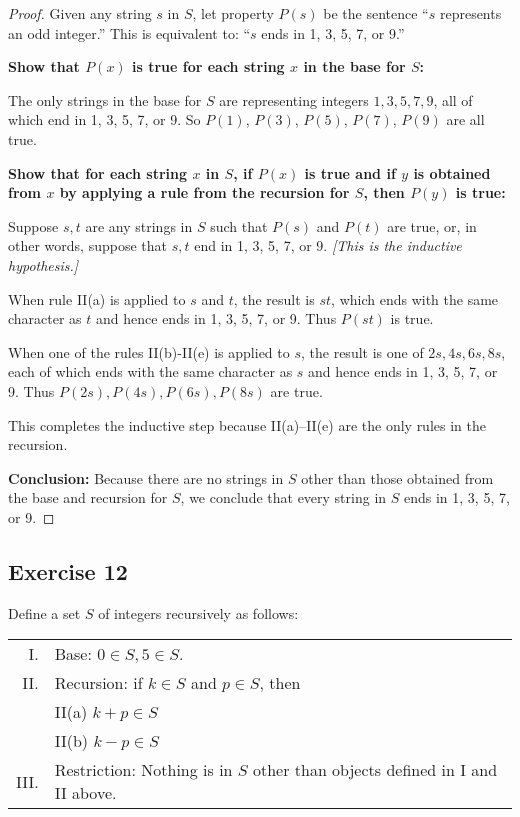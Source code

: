 \documentclass[14pt]{extarticle}
\begin{document}
\begin{proof}
    Given any string $s$ in $S$, let property $P(s)$ be the sentence “$s$ represents an odd integer.” This is
    equivalent to: ``$s$ ends in 1, 3, 5, 7, or 9.''

    {\bf Show that $P(x)$ is true for each string $x$ in the base for $S$:}

    The only strings in the base for $S$ are representing integers $1, 3, 5, 7, 9$, all of which end in 1, 3, 5, 7,
    or 9. So $P(1)$, $P(3)$, $P(5)$, $P(7)$, $P(9)$ are all true.

        {\bf Show that for each string $x$ in $S$, if $P(x)$ is true and if $y$ is obtained from $x$ by applying a rule
            from the recursion for $S$, then $P(y)$ is true:}

    Suppose $s, t$ are any strings in $S$ such that $P(s)$ and $P(t)$ are true, or, in other words, suppose that $s, t$ end in 1, 3, 5, 7, or 9. {\it [This is the inductive hypothesis.]}

    When rule II(a) is applied to $s$ and $t$, the result is $st$, which ends with the same character as $t$ and hence
    ends in 1, 3, 5, 7, or 9. Thus $P(st)$ is true.

    When one of the rules II(b)-II(e) is applied to $s$, the result is one of $2s, 4s, 6s, 8s$, each of which ends with
    the same character as $s$ and hence ends in 1, 3, 5, 7, or 9. Thus $P(2s), P(4s), P(6s), P(8s)$ are true.

    This completes the inductive step because II(a)–II(e) are the only rules in the recursion.

        {\bf Conclusion:} Because there are no strings in $S$ other than those obtained from the base and recursion for $S$, we
    conclude that every string in $S$ ends in 1, 3, 5, 7, or 9.
\end{proof}

\subsection{Exercise 12}
Define a set $S$ of integers recursively as follows:

\begin{tabular}{rl}
    I.   & Base: $0 \in S, 5 \in S$.                                                    \\
    II.  & Recursion: if $k \in S$ and $p \in S$, then                                  \\
         & II(a) $k+p \in S$                                                            \\
         & II(b) $k-p \in S$                                                            \\
    III. & Restriction: Nothing is in $S$ other than objects defined in I and II above.
\end{tabular}
\end{document}
